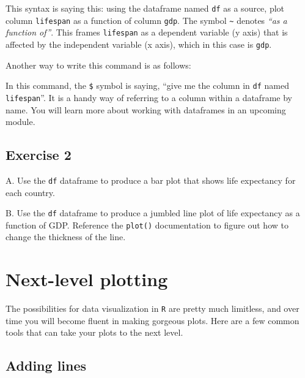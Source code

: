 \documentclass[
]{book}
\newenvironment{Shaded}{\begin{snugshade}}{\end{snugshade}}
\newcommand{\KeywordTok}[1]{\textcolor[rgb]{0.13,0.29,0.53}{\textbf{#1}}}
\newcommand{\NormalTok}[1]{#1}
\newcommand{\OperatorTok}[1]{\textcolor[rgb]{0.81,0.36,0.00}{\textbf{#1}}}
\newcommand{\StringTok}[1]{\textcolor[rgb]{0.31,0.60,0.02}{#1}}
\begin{document}
This syntax is saying this: using the dataframe named \texttt{df} as a source, plot column \texttt{lifespan} as a function of column \texttt{gdp}. The symbol \texttt{\textasciitilde{}} denotes \emph{``as a function of''}. This frames \texttt{lifespan} as a dependent variable (y axis) that is affected by the independent variable (x axis), which in this case is \texttt{gdp}.

Another way to write this command is as follows:

\begin{Shaded}
\end{Shaded}

In this command, the \texttt{\$} symbol is saying, ``give me the column in \texttt{df} named \texttt{lifespan}''. It is a handy way of referring to a column within a dataframe by name. You will learn more about working with dataframes in an upcoming module.

\hypertarget{exercise-2-5}{%
\subsection*{Exercise 2}\label{exercise-2-5}}

A. Use the \texttt{df} dataframe to produce a bar plot that shows life expectancy for each country.

B. Use the \texttt{df} dataframe to produce a jumbled line plot of life expectancy as a function of GDP. Reference the \texttt{plot()} documentation to figure out how to change the thickness of the line.

\hypertarget{next-level-plotting}{%
\section*{Next-level plotting}\label{next-level-plotting}}

The possibilities for data visualization in \texttt{R} are pretty much limitless, and over time you will become fluent in making gorgeous plots. Here are a few common tools that can take your plots to the next level.

\hypertarget{adding-lines}{%
\subsection*{Adding lines}\label{adding-lines}}
\end{document}

